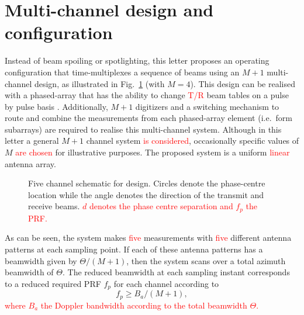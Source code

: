 \documentclass[journal]{IEEEtran}
\newcommand{\threeDB}{\ensuremath{\Theta}}
\newcommand{\aziBW}{\ensuremath{B_a}}
\newcommand{\prf}{\ensuremath{f_p}}
\newcommand{\prfEffective}{\ensuremath{\prf}}
\newcommand{\phaseSep}{\ensuremath{d}}
\newcommand{\cg}[1]{\textcolor{red}{#1}}
\begin{document}
\section{Multi-channel design and configuration}
Instead of beam spoiling or spotlighting, this letter proposes an operating configuration that time-multiplexes a sequence of beams using an $M+1$ multi-channel design, as illustrated in Fig.~\ref{fg:fivechan} (with $M=4$). This design can be realised with a phased-array that has the ability to change \cg{T/R} beam tables on a pulse by pulse basis \cite{CalabreseDiego2014, SikanetaGierullTGRS2015}. Additionally, $M+1$ digitizers and a switching mechanism to route and combine the measurements from each phased-array element (i.e.~form subarrays) are required to realise this multi-channel system. Although in this letter a general $M+1$ channel system \cg{is considered}, occasionally specific values of $M$ \cg{are chosen} for illustrative purposes. The proposed system is a uniform \cg{linear} antenna array.
\begin{figure}[h!]
\begin{center}
 \resizebox{0.95\columnwidth}{!}{}
 \caption{Five channel schematic for design. Circles denote the phase-centre location while the angle denotes the direction of the transmit and receive beams. \cg{$\phaseSep$ denotes the phase centre separation and $\prfEffective$ the PRF.}}
 \label{fg:fivechan}
 \end{center}
\end{figure}
\par
As can be seen, the system makes \cg{five} measurements with \cg{five} different antenna patterns at each sampling point. If each of these antenna patterns has a beamwidth given by $\threeDB/(M+1)$, then the system scans over a total azimuth beamwidth of $\threeDB$. The reduced beamwidth at each sampling instant corresponds to a reduced required PRF $\prfEffective$ for each channel according to
\begin{equation}
 \prfEffective \geq \aziBW/(M+1),
\end{equation}
\cg{where $\aziBW$ the Doppler bandwidth according to the total beamwidth $\threeDB$.}

\end{document}
